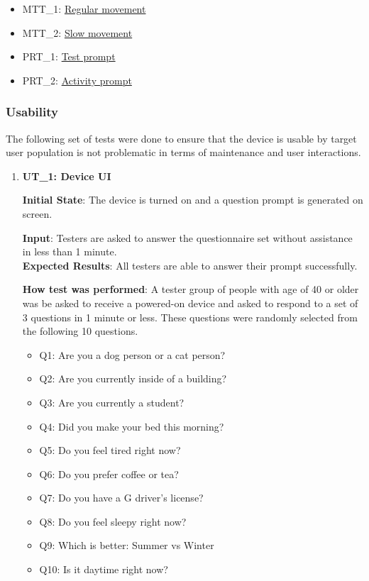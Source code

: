 \documentclass[12pt, titlepage]{article}
\begin{document}
\begin{itemize}
  \item MTT\_1: \hyperref[MTT1]{Regular movement}
  \item MTT\_2: \hyperref[MTT2]{Slow movement}
  \item PRT\_1: \hyperref[PRT1]{Test prompt}
  \item PRT\_2: \hyperref[PRT2]{Activity prompt}
\end{itemize}

\subsubsection{Usability}
The following set of tests were done to ensure that the device is usable by target user population is not problematic in terms of maintenance and user interactions.
\begin{enumerate}

  \item\textbf{{UT\_1: Device UI\\}}\label{UT1}

  \textbf{Initial State}: The device is turned on and a question prompt is generated on screen.

  \textbf{Input}: Testers are asked to answer the questionnaire set without assistance in less than 1 minute.\\
  \textbf{Expected Results}: All testers are able to answer their prompt successfully.

  \textbf{How test was performed}: A tester group of people with age of 40 or older was be asked to receive a powered-on device and asked to respond to a set of 3 questions in 1 minute or less. These questions were randomly selected from the following 10 questions.

  \begin{itemize}
    \item Q1: Are you a dog person or a cat person?
    \item Q2: Are you currently inside of a building?
    \item Q3: Are you currently a student?
    \item Q4: Did you make your bed this morning?
    \item Q5: Do you feel tired right now?
    \item Q6: Do you prefer coffee or tea?
    \item Q7: Do you have a G driver's license?
    \item Q8: Do you feel sleepy right now?
    \item Q9: Which is better: Summer vs Winter
    \item Q10: Is it daytime right now?
  \end{itemize}


\end{enumerate}
\end{document}
